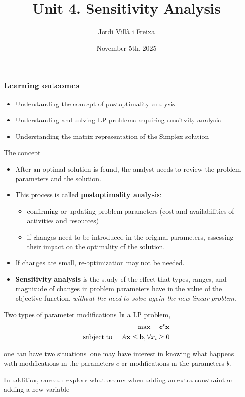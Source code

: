 \documentclass[c]{beamer}
\title[Introduction]{Unit 4. Sensitivity Analysis}
\author{Jordi Villà i Freixa}
\institute[FCTE]{
Universitat de Vic - Universitat Central de Catalunya \\
Study Abroad. Operations Research\\
\medskip
\textit{jordi.villa@uvic.cat\\\url{https://mon.uvic.cat/cbbl}}
}
\date{November 5th, 2025}
\begin{document}
\begin{frame}
\titlepage
\end{frame}




\begin{frame}
\frametitle{Learning outcomes}
\begin{itemize}
  \item Understanding the concept of postoptimality analysis
  \item Understanding and solving LP problems requiring sensitvity analysis
  \item Understanding the matrix representation of the Simplex solution
\end{itemize}
\end{frame}

\begin{frame}{The concept}
\begin{itemize}
  \item After an optimal solution is found, the analyst needs to review the problem parameters and the solution.
  \item This process is called {\bf postoptimality analysis}:
  \begin{itemize}
    \item confirming or updating problem parameters (cost and availabilities of activities and resources)
    \item if changes need to be introduced in the original parameters, assessing their impact on the optimality of the solution.
  \end{itemize}
  \item If changes are small, re-optimization may not be needed.
  \item {\bf Sensitivity analysis} is the study of the effect that types, ranges, and magnitude of changes in problem parameters have in the value of the objective function, {\em without the need to solve again the new linear problem}.
\end{itemize}
\end{frame}

\begin{frame}{Two types of parameter modifications}
  In a LP problem, 
\begin{eqnarray*}
 \text{max }\quad\textbf{c}^t \textbf{x}\\
 \text{subject to }\quad A\textbf{x}\leq \textbf{b}, \forall x_i\geq0
\end{eqnarray*}

one can have two situations: one may have interest in knowing what happens with modifications in the parameters $c$ or modifications in the parameters $b$.

In addition, one can explore what occurs when adding an extra constraint or adding a new variable.

\end{frame}
\end{document}
